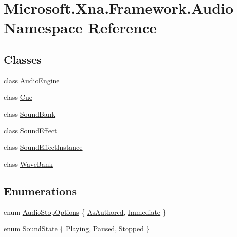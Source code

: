 \hypertarget{namespaceMicrosoft_1_1Xna_1_1Framework_1_1Audio}{}\section{Microsoft.\+Xna.\+Framework.\+Audio Namespace Reference}
\label{namespaceMicrosoft_1_1Xna_1_1Framework_1_1Audio}
\subsection*{Classes}
\begin{DoxyCompactItemize}
\item 
class \hyperlink{classMicrosoft_1_1Xna_1_1Framework_1_1Audio_1_1AudioEngine}{Audio\+Engine}
\item 
class \hyperlink{classMicrosoft_1_1Xna_1_1Framework_1_1Audio_1_1Cue}{Cue}
\item 
class \hyperlink{classMicrosoft_1_1Xna_1_1Framework_1_1Audio_1_1SoundBank}{Sound\+Bank}
\item 
class \hyperlink{classMicrosoft_1_1Xna_1_1Framework_1_1Audio_1_1SoundEffect}{Sound\+Effect}
\item 
class \hyperlink{classMicrosoft_1_1Xna_1_1Framework_1_1Audio_1_1SoundEffectInstance}{Sound\+Effect\+Instance}
\item 
class \hyperlink{classMicrosoft_1_1Xna_1_1Framework_1_1Audio_1_1WaveBank}{Wave\+Bank}
\end{DoxyCompactItemize}
\subsection*{Enumerations}
\begin{DoxyCompactItemize}
\item 
enum \hyperlink{namespaceMicrosoft_1_1Xna_1_1Framework_1_1Audio_a8971953d3b31e62db241f81984a5433f}{Audio\+Stop\+Options} \{ \hyperlink{namespaceMicrosoft_1_1Xna_1_1Framework_1_1Audio_a8971953d3b31e62db241f81984a5433faf6eea1c818e227b0154e61b0457b108d}{As\+Authored}, 
\hyperlink{namespaceMicrosoft_1_1Xna_1_1Framework_1_1Audio_a8971953d3b31e62db241f81984a5433fa43f6615bbb2c40a5306ff804094420b1}{Immediate}
 \}
\item 
enum \hyperlink{namespaceMicrosoft_1_1Xna_1_1Framework_1_1Audio_a992c49496c8f2b5bab2af1b15a41d5d1}{Sound\+State} \{ \hyperlink{namespaceMicrosoft_1_1Xna_1_1Framework_1_1Audio_a992c49496c8f2b5bab2af1b15a41d5d1ac9dbb2b7c84159b632d71e512eba8428}{Playing}, 
\hyperlink{namespaceMicrosoft_1_1Xna_1_1Framework_1_1Audio_a992c49496c8f2b5bab2af1b15a41d5d1ae99180abf47a8b3a856e0bcb2656990a}{Paused}, 
\hyperlink{namespaceMicrosoft_1_1Xna_1_1Framework_1_1Audio_a992c49496c8f2b5bab2af1b15a41d5d1ac23e2b09ebe6bf4cb5e2a9abe85c0be2}{Stopped}
 \}
\end{DoxyCompactItemize}



